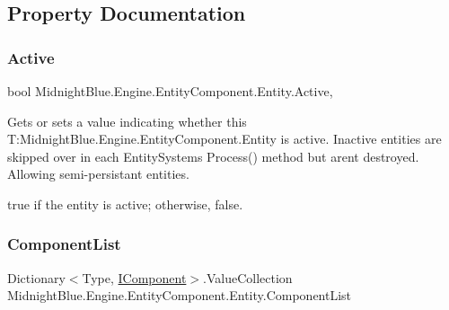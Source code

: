 \subsection{Property Documentation}
\hypertarget{class_midnight_blue_1_1_engine_1_1_entity_component_1_1_entity_a746382aa60e12465f1d4df0523dbbf50}{}\label{class_midnight_blue_1_1_engine_1_1_entity_component_1_1_entity_a746382aa60e12465f1d4df0523dbbf50} 
\subsubsection{\texorpdfstring{Active}{Active}}
{\footnotesize\ttfamily bool Midnight\+Blue.\+Engine.\+Entity\+Component.\+Entity.\+Active\hspace{0.3cm}{\ttfamily [get]}, {\ttfamily [set]}}



Gets or sets a value indicating whether this T\+:\+Midnight\+Blue.\+Engine.\+Entity\+Component.\+Entity is active. Inactive entities are skipped over in each Entity\+Systems Process() method but aren\textquotesingle{}t destroyed. Allowing semi-\/persistant entities. 

{\ttfamily true} if the entity is active; otherwise, {\ttfamily false}.\hypertarget{class_midnight_blue_1_1_engine_1_1_entity_component_1_1_entity_ab78b270aa9552e6de6d5fcdb60bf4b59}{}\label{class_midnight_blue_1_1_engine_1_1_entity_component_1_1_entity_ab78b270aa9552e6de6d5fcdb60bf4b59} 
\subsubsection{\texorpdfstring{Component\+List}{ComponentList}}
{\footnotesize\ttfamily Dictionary$<$Type, \hyperlink{interface_midnight_blue_1_1_engine_1_1_entity_component_1_1_i_component}{I\+Component}$>$.Value\+Collection Midnight\+Blue.\+Engine.\+Entity\+Component.\+Entity.\+Component\+List\hspace{0.3cm}{\ttfamily [get]}}



